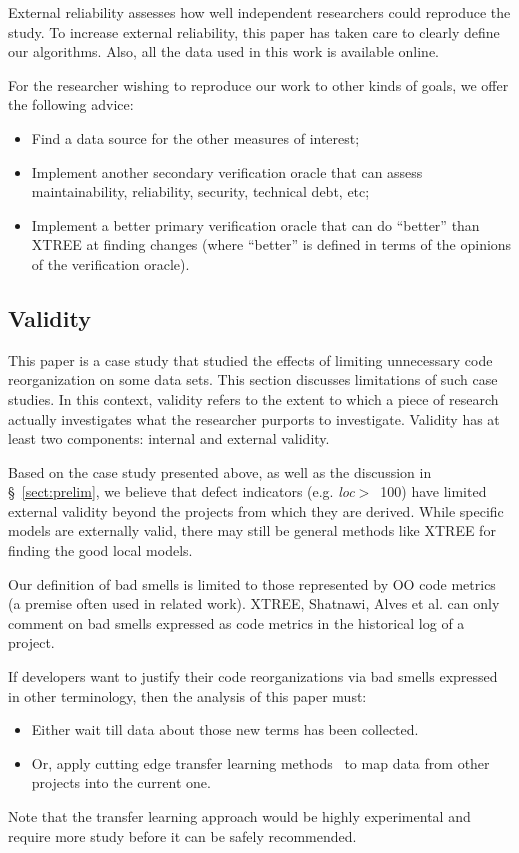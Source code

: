 \documentclass[sigconf, proceedings, 9pt]{acmart}
\newcommand{\tion}[1]{\S~\ref{sect:#1}}
\begin{document}
External reliability assesses how well independent researchers
could reproduce the study. To increase external
reliability, this paper has taken care to clearly define our
algorithms. Also, all the data used in this work is available
online.

For the researcher wishing to reproduce our work to other kinds of goals, 
we offer the following advice:

\begin{itemize}
\item Find a data source for the other measures of interest;
\item Implement another secondary verification oracle that can assess 
maintainability, reliability, security, technical debt, etc;
\item Implement a better primary verification oracle that can do ``better'' 
than XTREE at finding changes (where ``better'' is defined in terms
of the opinions of the verification oracle). 
\end{itemize}


\subsection{Validity}

This paper is a case study that studied the effects of  limiting 
unnecessary code reorganization on some data sets. This section discusses 
limitations of such case studies. In this context, validity refers to the 
extent to which a piece of research actually
investigates what the researcher purports to investigate.
Validity has at least two components: internal and
external validity.


Based on the case study presented above,
as well as the discussion in \tion{prelim},
we believe that defect indicators (e.g. \mbox{{\em loc}$>$ 100})
have limited external validity beyond the projects from which they are 
derived.
While specific models are externally valid,
there may still be general methods like XTREE for finding the good local 
models.

Our definition of bad smells is limited to those represented by OO code 
metrics (a premise often used in related work).
XTREE, Shatnawi, Alves et al. can  only comment
on bad smells   expressed as code metrics
in the historical log of a project.

If developers want to justify their code reorganizations
via bad smells expressed in other terminology,
then the  analysis of this paper must:
\begin{itemize}
	\item Either wait till
	data about those new
	terms has been collected.
	\item Or, apply cutting edge transfer learning
	methods~\cite{Nam15,Jing15, krishna16} to map data from other projects
	into the current one.
\end{itemize}
Note that the transfer learning approach would
be highly experimental and require more study
before it can be safely recommended.
\end{document}
